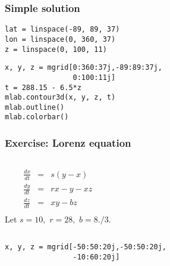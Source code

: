 \documentclass[compress,14pt]{beamer}
\newcounter{time}
\newcommand{\inctime}[1]{\addtocounter{time}{#1}{\vspace*{0.1in}\tiny \thetime\ m}}
\begin{document}
\begin{frame}[fragile]
    \frametitle{Simple solution}

    \begin{lstlisting}
lat = linspace(-89, 89, 37)
lon = linspace(0, 360, 37)
z = linspace(0, 100, 11)
    \end{lstlisting}
\pause
    \begin{lstlisting}
x, y, z = mgrid[0:360:37j,-89:89:37j,
                0:100:11j]
t = 288.15 - 6.5*z
mlab.contour3d(x, y, z, t)
mlab.outline()
mlab.colorbar()
    \end{lstlisting}
\end{frame}

\begin{frame}[fragile]
    \frametitle{Exercise: Lorenz equation}
    \begin{columns}
        \begin{eqnarray*}
        \frac{d x}{dt} &=& s (y-x)\\
        \frac{d y}{d t} &=& rx -y -xz\\
        \frac{d z}{d t} &=& xy - bz\\
        \end{eqnarray*}
        Let $s=10,$
        $r=28,$ 
        $b=8./3.$
    \end{columns}
  \begin{lstlisting}
x, y, z = mgrid[-50:50:20j,-50:50:20j,
                -10:60:20j]
  \end{lstlisting}
\inctime{20}
\end{frame}
  
\end{document}
